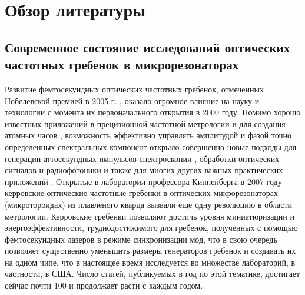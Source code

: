 \chapter{Обзор литературы} \label{chapt1}

\section{Современное состояние исследований оптических частотных гребенок в микрорезонаторах} \label{sect1_1}

Развитие фемтосекундных оптических частотных гребенок, отмеченных Нобелевской премией в 2005 г. \cite{Hall2006}, оказало огромное влияние на науку и технологии с момента их первоначального открытия в 2000 году. Помимо хорошо известных приложений в прецизионной частотной метрологии и для создания атомных часов \cite{Diddams2001,Udem2002,Ye2005,Diddams2004}, возможность эффективно управлять амплитудой и фазой точно определенных спектральных компонент открыло совершенно новые подходы для генерации аттосекундных импульсов \cite{Jones2000,Telle1999} спектроскопии \cite{Stowe2008,Diddams2007,Ideguchi2013,Holzwarth2000}, обработки оптических сигналов и радиофотоники \cite{Gao2006,Torres2014} и также для многих других важных практических приложений \cite{Newbury2011,Steinmetz2008,Fortier2011}. Открытые в лаборатории профессора Киппенберга в 2007 году керровские оптические частотные гребенки в оптических микрорезонаторах (микротороидах) из плавленого кварца \cite{DelHaye2007,Kippenberg2011} вызвали еще одну революцию в области метрологии. Керровские гребенки позволяют достичь уровня миниатюризации и энергоэффективности, труднодостижимого для гребенок, полученных с помощью фемтосекундных лазеров в режиме синхронизации мод, что в свою очередь позволяет существенно уменьшить размеры генераторов гребенок и создавать их на одном чипе, что в настоящее время исследуется во множестве лабораторий, в частности, в США. Число статей, публикуемых в год по этой тематике, достигает сейчас почти 100 и продолжает расти с каждым годом.


